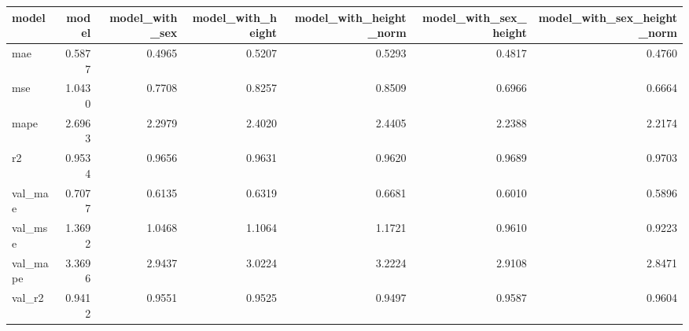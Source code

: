 \begin{tabular}{lrrrrrr}
\toprule
model &  model &  model\_with\_sex &  model\_with\_height &  model\_with\_height\_norm &  model\_with\_sex\_height &  model\_with\_sex\_height\_norm \\
\midrule
mae      & 0.5877 &          0.4965 &             0.5207 &                  0.5293 &                 0.4817 &                      0.4760 \\
mse      & 1.0430 &          0.7708 &             0.8257 &                  0.8509 &                 0.6966 &                      0.6664 \\
mape     & 2.6963 &          2.2979 &             2.4020 &                  2.4405 &                 2.2388 &                      2.2174 \\
r2       & 0.9534 &          0.9656 &             0.9631 &                  0.9620 &                 0.9689 &                      0.9703 \\
val\_mae  & 0.7077 &          0.6135 &             0.6319 &                  0.6681 &                 0.6010 &                      0.5896 \\
val\_mse  & 1.3692 &          1.0468 &             1.1064 &                  1.1721 &                 0.9610 &                      0.9223 \\
val\_mape & 3.3696 &          2.9437 &             3.0224 &                  3.2224 &                 2.9108 &                      2.8471 \\
val\_r2   & 0.9412 &          0.9551 &             0.9525 &                  0.9497 &                 0.9587 &                      0.9604 \\
\bottomrule
\end{tabular}
